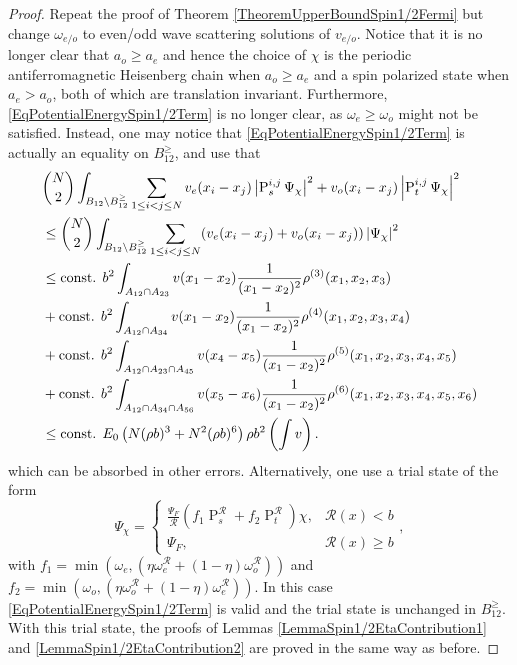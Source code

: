 \begin{proof}
	Repeat the proof of Theorem \ref{TheoremUpperBoundSpin1/2Fermi} but change $ \omega_{e/o} $ to even/odd wave scattering solutions of $ v_{e/o} $. Notice that it is no longer clear that $ a_o\geq a_e $ and hence the choice of $ \chi $ is the periodic antiferromagnetic Heisenberg chain when $ a_o\geq a_e $ and a spin polarized state when $ a_e>a_o $, both of which are translation invariant. Furthermore, \eqref{EqPotentialEnergySpin1/2Term} is no longer clear, as $\omega_e\geq \omega_o$ might not be satisfied. Instead, one may notice that \eqref{EqPotentialEnergySpin1/2Term} is actually an equality on $B_{12}^{\geq}$, and use that \begin{equation*}
		\begin{aligned}
		&\binom{N}{2}\int_{B_{12}\setminus B_{12}^{\geq}} \sum_{1\leq i<j\leq N} v_e(x_i-x_j)\left\lvert \operatorname{P}_s^{i,j}\Psi_{\chi} \right\rvert^2+v_o(x_i-x_j)\left\lvert \operatorname{P}_t^{i,j}\Psi_{\chi} \right\rvert^2\\&
		\leq \binom{N}{2}\int_{B_{12}\setminus B_{12}^{\geq}} \sum_{1\leq i<j\leq N} (v_e(x_i-x_j)+v_o(x_i-x_j))\left\lvert \Psi_{\chi} \right\rvert^2\\&
		\leq \text{const. }b^2 \int_{A_{12}\cap A_{23}} v(x_1-x_2)\frac{1}{(x_1-x_2)^2}\rho^{(3)}(x_1,x_2,x_3)\\&
		+\text{const. }b^2 \int_{A_{12}\cap A_{34}} v(x_1-x_2)\frac{1}{(x_1-x_2)^2}\rho^{(4)}(x_1,x_2,x_3,x_4)\\&
		+\text{const. }b^2 \int_{A_{12}\cap A_{23}\cap A_{45}} v(x_4-x_5)\frac{1}{(x_1-x_2)^2}\rho^{(5)}(x_1,x_2,x_3,x_4,x_5)\\&
		+\text{const. }b^2 \int_{A_{12}\cap A_{34}\cap A_{56}} v(x_5-x_6)\frac{1}{(x_1-x_2)^2}\rho^{(6)}(x_1,x_2,x_3,x_4,x_5,x_6)\\
		&\leq \text{const. } E_0 \left(N(\rho b)^3+N^2(\rho b)^6\right) \rho b^2\left(\int v\right).
		\end{aligned}
	\end{equation*}
	which can be absorbed in other errors.
	Alternatively, one use a trial state of the form\begin{equation}
	\Psi_\chi=\begin{cases}
	\frac{\Psi_F}{\mathcal{R}}\left(f_1\operatorname{P}_s^{\mathcal{R}}+f_2\operatorname{P}_t^{\mathcal{R}}\right)\chi,&\mathcal{R}(x)<b\\
	\Psi_F,&\mathcal{R}(x)\geq b
	\end{cases},
	\end{equation}
	with $f_1=\min\left(\omega_e,\left(\eta\omega^{\mathcal{R}}_e+(1-\eta)\omega^{\mathcal{R}}_o\right)\right)$ and $f_2=\min\left(\omega_o,\left(\eta\omega^{\mathcal{R}}_o+(1-\eta)\omega^{\mathcal{R}}_e\right)\right)$. In this case \eqref{EqPotentialEnergySpin1/2Term} is valid and the trial state is unchanged in $B_{12}^{\geq}$. With this trial state, the proofs of Lemmas \ref{LemmaSpin1/2EtaContribution1} and \ref{LemmaSpin1/2EtaContribution2} are proved in the same way as before.
\end{proof}
